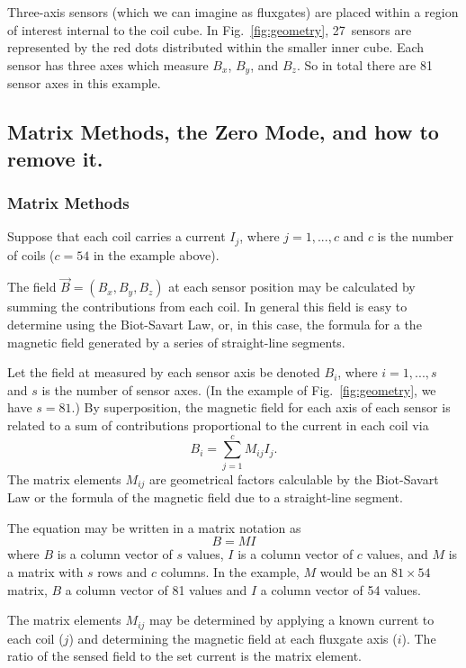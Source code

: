 \documentclass[preprint,12pt]{elsarticle}
\begin{document}
Three-axis sensors (which we can imagine as fluxgates) are placed
within a region of interest internal to the coil cube.  In
Fig.~\ref{fig:geometry}, 27~sensors are represented by the red dots
distributed within the smaller inner cube.  Each sensor has three axes
which measure $B_x$, $B_y$, and $B_z$.  So in total there are 81
sensor axes in this example.

\subsection{Matrix Methods, the Zero Mode, and how to remove it.}

\subsubsection{Matrix Methods}

Suppose that each coil carries a current $I_j$, where $j=1,...,c$ and
$c$ is the number of coils ($c=54$ in the example above).

The field $\vec{B}=(B_x,B_y,B_z)$ at each sensor position may be
calculated by summing the contributions from each coil.  In general
this field is easy to determine using the Biot-Savart Law, or, in this
case, the formula for a the magnetic field generated by a series of
straight-line segments.

Let the field at measured by each sensor axis be denoted $B_i$, where
$i=1,...,s$ and $s$ is the number of sensor axes.  (In the example of
Fig.~\ref{fig:geometry}, we have $s=81$.)  By superposition, the
magnetic field for each axis of each sensor is related to a sum of
contributions proportional to the current in each coil via
\begin{equation}
  B_i=\sum_{j=1}^cM_{ij}I_j.
\end{equation}
The matrix elements $M_{ij}$ are geometrical factors calculable by the
Biot-Savart Law or the formula of the magnetic field due to a
straight-line segment.

The equation may be written in a matrix notation as
\begin{equation}
  B=MI
\end{equation}
where $B$ is a column vector of $s$ values, $I$ is a column vector of
$c$ values, and $M$ is a matrix with $s$ rows and $c$ columns.  In the
example, $M$ would be an $81\times 54$ matrix, $B$ a column vector of
81 values and $I$ a column vector of 54 values.

The matrix elements $M_{ij}$ may be determined by applying a known
current to each coil ($j$) and determining the magnetic field at each
fluxgate axis ($i$).  The ratio of the sensed field to the set current
is the matrix element.
\end{document}
